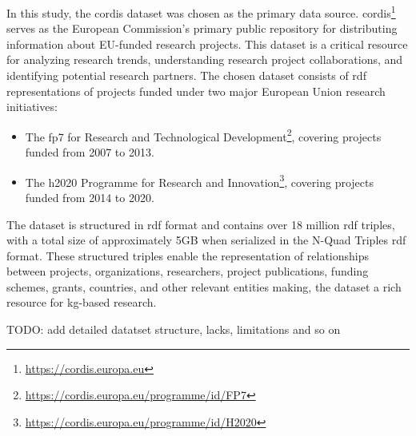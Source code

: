 In this study, the \gls{cordis} dataset \cite{CORDIS_FP7_2015,CORDIS_H2020_2015,CORDIS_RefData_2018} was chosen as the primary data source.
\gls{cordis}\footnote{\url{https://cordis.europa.eu}} serves as the European Commission's primary public repository for distributing information about EU-funded research projects.
This dataset is a critical resource for analyzing research trends, understanding research project collaborations, and identifying potential research partners.
The chosen dataset consists of \gls{rdf} representations of projects funded under two major European Union research initiatives:
\begin{itemize}
    \item The \gls{fp7} for Research and Technological Development\footnote{\url{https://cordis.europa.eu/programme/id/FP7}}, covering projects funded from 2007 to 2013.
    \item The \gls{h2020} Programme for Research and Innovation\footnote{\url{https://cordis.europa.eu/programme/id/H2020}}, covering projects funded from 2014 to 2020.
\end{itemize}

The dataset is structured in \gls{rdf} format and contains over 18 million \gls{rdf} triples, with a total size of approximately 5GB when serialized in the N-Quad Triples \gls{rdf} format.
These structured triples enable the representation of relationships between projects, organizations, researchers, project publications, funding schemes, grants, countries, and other relevant entities making, the dataset a rich resource for \gls{kg}-based research.

TODO: add detailed datatset structure, lacks, limitations and so on
